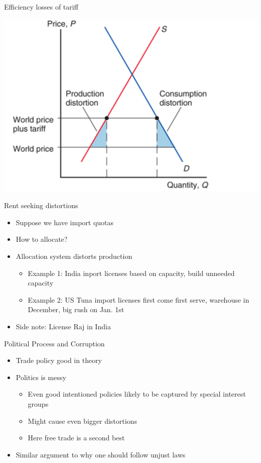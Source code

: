 \documentclass{beamer}
\begin{document}
\begin{frame}{Efficiency losses of tariff}

    \includegraphics[scale=0.25]{tariff_distortion.png}

\end{frame}

\begin{frame}{Rent seeking distortions}

    \begin{itemize}
        \item Suppose we have import quotas
        \item How to allocate?
        \item Allocation system distorts production
        \begin{itemize}
            \item Example 1: India inport licenses based on capacity, build unneeded capacity
            \item Example 2: US Tuna import licenses first come first serve, warehouse in December, big rush on Jan. 1st
        \end{itemize}
        \item Side note: License Raj in India
    \end{itemize}

\end{frame}

\begin{frame}{Political Process and Corruption}

    \begin{itemize}
        \item Trade policy good in theory
        \item Politics is messy
        \begin{itemize}
            \item Even good intentioned policies likely to be captured by special interest groups
            \item Might cause even bigger distortions
            \item Here free trade is a second best 
        \end{itemize} 
        \item Similar argument to why one should follow unjust laws
    \end{itemize}

\end{frame}
\end{document}
